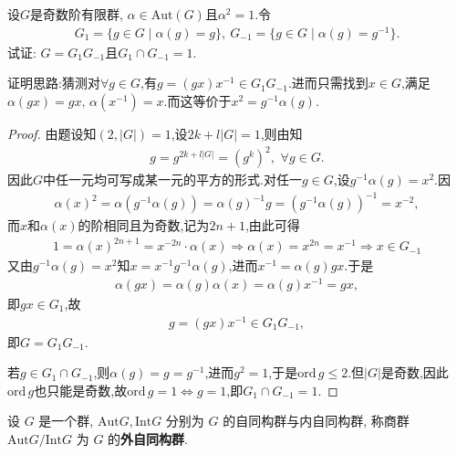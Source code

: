 \documentclass[../../main.tex]{subfiles}%
\begin{document}
\begin{example}
设$G$是奇数阶有限群, $\alpha\in \mathrm{Aut}(G)$且$\alpha^2=1$.令
\begin{align*}
G_1=\{g\in G\mid \alpha(g)=g\},\ G_{-1}=\{g\in G\mid \alpha(g)=g^{-1}\}.
\end{align*}
试证: $G=G_1G_{-1}$且$G_1\cap G_{-1}=1$.
\end{example}
\begin{note}
证明思路:猜测对$\forall g\in G$,有$g=(gx)x^{-1}\in G_1G_{-1}$.进而只需找到$x\in G$,满足$\alpha(gx)=gx,\,\alpha(x^{-1})=x$.而这等价于$x^2=g^{-1}\alpha(g)$.
\end{note}
\begin{proof}
由题设知$(2,|G|)=1$,设$2k+l|G|=1$,则由知
\begin{align*}
g=g^{2k+l|G|}=(g^k)^2,\,\,\forall g\in G.
\end{align*}
因此$G$中任一元均可写成某一元的平方的形式.对任一$g\in G$,设$g^{-1}\alpha(g)=x^2$.因
\begin{align*}
\alpha(x)^2=\alpha(g^{-1}\alpha(g))=\alpha(g)^{-1}g=(g^{-1}\alpha(g))^{-1}=x^{-2},
\end{align*}
而$x$和$\alpha(x)$的阶相同且为奇数,记为$2n+1$,由此可得
\begin{align*}
1=\alpha \left( x \right) ^{2n+1}=x^{-2n}\cdot \alpha \left( x \right) \Longrightarrow \alpha \left( x \right) =x^{2n}=x^{-1}\Longrightarrow x\in G_{-1}
\end{align*}
又由$g^{-1}\alpha(g)=x^2$知$x=x^{-1}g^{-1}\alpha(g)$,进而$x^{-1}=\alpha(g)gx$.于是
\begin{align*}
\alpha(gx)=\alpha(g)\alpha(x)=\alpha(g)x^{-1}=gx,
\end{align*}
即$gx\in G_1$,故
\begin{align*}
g=(gx)x^{-1}\in G_1G_{-1},
\end{align*}
即$G=G_1G_{-1}$.

若$g\in G_1\cap G_{-1}$,则$\alpha(g)=g=g^{-1}$,进而$g^2=1$,于是$\text{ord}\,g\leqslant 2$.但$|G|$是奇数,因此$\text{ord}\,g$也只能是奇数,故$\text{ord}\,g=1 \iff g=1$,即$G_1\cap G_{-1}=1$.

\end{proof}

\begin{definition}
设 \( G \) 是一个群, \( \text{Aut}G, \text{Int}G \) 分别为 \( G \) 的自同构群与内自同构群, 称商群 \( \text{Aut}G/\text{Int}G \) 为 \( G \) 的\textbf{外自同构群}.
\end{definition}
\end{document}
